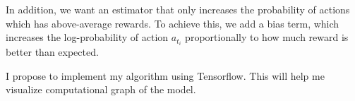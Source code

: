 \documentclass[12pt,a4paper]{article}
\begin{document}
In addition, we want an estimator that only increases the probability of actions which has above-average rewards. To achieve this, we add a bias term, which increases the log-probability of action $a_{t_i}$ proportionally to how much reward is better than expected.



I propose to implement my algorithm using Tensorflow. This will help me visualize computational graph of the model.

%
%

\printbibliography
\end{document}
